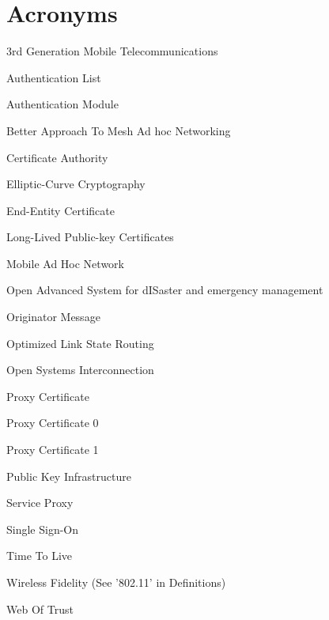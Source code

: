 \chapter*{Acronyms}

\begin{acronym}

 {3rd Generation Mobile Telecommunications}


 {Authentication List}

 {Authentication Module}

 {Better Approach To Mesh Ad hoc Networking}

 {Certificate Authority}





 {Elliptic-Curve Cryptography}

 {End-Entity Certificate}

 {Long-Lived Public-key Certificates}

 {Mobile Ad Hoc Network}


 {Open Advanced System for dISaster and emergency management}

 {Originator Message}

 {Optimized Link State Routing}

 {Open Systems Interconnection}

 {Proxy Certificate}

 {Proxy Certificate 0}

 {Proxy Certificate 1}


 {Public Key Infrastructure}



 {Service Proxy}

 {Single Sign-On}

 {Time To Live}


 {Wireless Fidelity (See '802.11' in Definitions)}

 {Web Of Trust}

\end{acronym}
